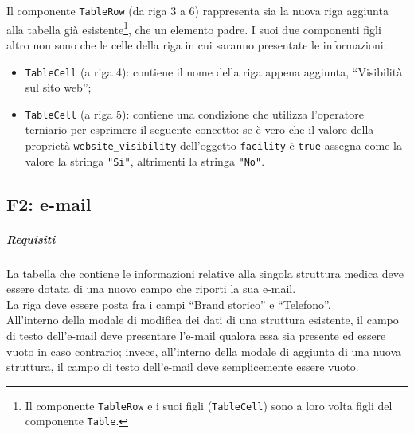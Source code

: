 Il componente \texttt{TableRow} (da riga 3 a 6) rappresenta sia la nuova riga aggiunta alla tabella già esistente\footnote{Il componente \texttt{TableRow} e i suoi figli (\texttt{TableCell}) sono a loro volta figli del componente \texttt{Table}.}, che un elemento padre. I suoi due componenti figli altro non sono che le celle della riga in cui saranno presentate le informazioni:
\begin{itemize}
    \item \texttt{TableCell} (a riga 4): contiene il nome della riga appena aggiunta, “Visibilità sul sito web”;
    
    \item \texttt{TableCell} (a riga 5): contiene una condizione che utilizza l'operatore terniario per esprimere il seguente concetto: se è vero che il valore della proprietà \texttt{website\_visibility} dell'oggetto \texttt{facility} è \texttt{true} assegna come la valore la stringa \texttt{"Si"}, altrimenti la stringa \texttt{"No"}.
\end{itemize}



\subsection{F2: e-mail}
\subparagraph{Requisiti}
La tabella che contiene le informazioni relative alla singola struttura medica deve essere dotata di una nuovo campo che riporti la sua e-mail.\\
La riga deve essere posta fra i campi “Brand storico” e “Telefono”.\\ 
All'interno della modale di modifica dei dati di una struttura esistente, il campo di testo dell'e-mail deve presentare l'e-mail qualora essa sia presente ed essere vuoto in caso contrario; invece, all'interno della modale di aggiunta di una nuova struttura, il campo di testo dell'e-mail deve semplicemente essere vuoto.



